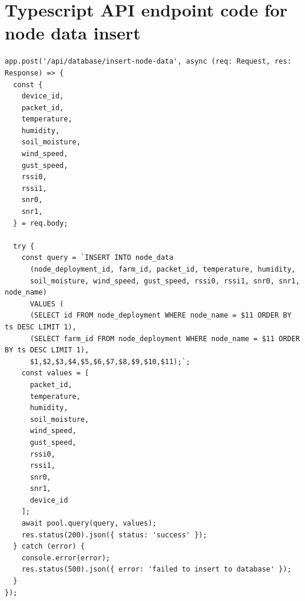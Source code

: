 \section{Typescript API endpoint code for node data insert}\label{app:api-endpoint}
\begin{multicols}{2}
\begin{lstlisting}
app.post('/api/database/insert-node-data', async (req: Request, res: Response) => {
  const {
    device_id,
    packet_id,
    temperature,
    humidity,
    soil_moisture,
    wind_speed,
    gust_speed,
    rssi0,
    rssi1,
    snr0,
    snr1,
  } = req.body;

  try {
    const query = `INSERT INTO node_data 
      (node_deployment_id, farm_id, packet_id, temperature, humidity, 
      soil_moisture, wind_speed, gust_speed, rssi0, rssi1, snr0, snr1, node_name)
      VALUES (
      (SELECT id FROM node_deployment WHERE node_name = $11 ORDER BY ts DESC LIMIT 1),
      (SELECT farm_id FROM node_deployment WHERE node_name = $11 ORDER BY ts DESC LIMIT 1),
      $1,$2,$3,$4,$5,$6,$7,$8,$9,$10,$11);`;
    const values = [
      packet_id,
      temperature,
      humidity,
      soil_moisture,
      wind_speed,
      gust_speed,
      rssi0,
      rssi1,
      snr0,
      snr1,
      device_id
    ];
    await pool.query(query, values);
    res.status(200).json({ status: 'success' });
  } catch (error) {
    console.error(error);
    res.status(500).json({ error: 'failed to insert to database' });
  }
});
\end{lstlisting}
\end{multicols}

